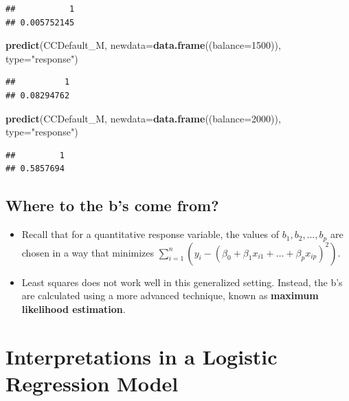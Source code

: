 \documentclass[]{book}
\newenvironment{Shaded}{\begin{snugshade}}{\end{snugshade}}
\newcommand{\KeywordTok}[1]{\textcolor[rgb]{0.13,0.29,0.53}{\textbf{#1}}}
\newcommand{\DataTypeTok}[1]{\textcolor[rgb]{0.13,0.29,0.53}{#1}}
\newcommand{\DecValTok}[1]{\textcolor[rgb]{0.00,0.00,0.81}{#1}}
\newcommand{\StringTok}[1]{\textcolor[rgb]{0.31,0.60,0.02}{#1}}
\newcommand{\NormalTok}[1]{#1}
\begin{document}
\begin{verbatim}
##           1 
## 0.005752145
\end{verbatim}

\begin{Shaded}
\begin{Highlighting}[]
\KeywordTok{predict}\NormalTok{(CCDefault_M, }\DataTypeTok{newdata=}\KeywordTok{data.frame}\NormalTok{((}\DataTypeTok{balance=}\DecValTok{1500}\NormalTok{)), }\DataTypeTok{type=}\StringTok{"response"}\NormalTok{)}
\end{Highlighting}
\end{Shaded}

\begin{verbatim}
##          1 
## 0.08294762
\end{verbatim}

\begin{Shaded}
\begin{Highlighting}[]
\KeywordTok{predict}\NormalTok{(CCDefault_M, }\DataTypeTok{newdata=}\KeywordTok{data.frame}\NormalTok{((}\DataTypeTok{balance=}\DecValTok{2000}\NormalTok{)), }\DataTypeTok{type=}\StringTok{"response"}\NormalTok{)}
\end{Highlighting}
\end{Shaded}

\begin{verbatim}
##         1 
## 0.5857694
\end{verbatim}

\subsection{Where to the b's come
from?}\label{where-to-the-bs-come-from}

\begin{itemize}
\item
  Recall that for a quantitative response variable, the values of
  \(b_1, b_2, \ldots, b_p\) are chosen in a way that minimizes
  \(\displaystyle\sum_{i=1}^n \left(y_i-(\beta_0+\beta_1x_{i1}+\ldots+\beta_px_{ip})^2\right)\).
\item
  Least squares does not work well in this generalized setting. Instead,
  the b's are calculated using a more advanced technique, known as
  \textbf{maximum likelihood estimation}.
\end{itemize}

\section{Interpretations in a Logistic Regression
Model}\label{interpretations-in-a-logistic-regression-model}
\end{document}
